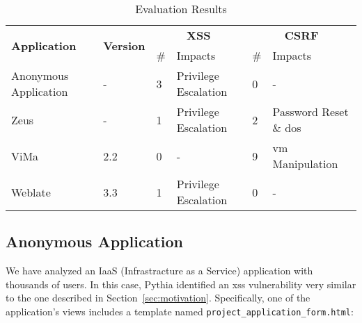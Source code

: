 \begin{center}
\begin{table}[b]
  \caption{Evaluation Results}
  \vspace{-1.9mm}
  \begin{tabular}{|p{1.8cm}| l | lp{1.6cm}|lp{1.6cm}|}
    \hline
     \multirow{2}{*}{\textbf{Application}} &
        \multirow{2}{*}{\textbf{Version}} &
        \multicolumn{2}{c|}{\textbf{XSS}} &
        \multicolumn{2}{c|}{\textbf{CSRF}} \\ 
        & & {\#} &  {Impacts} & {\#}  & {Impacts} \\ \hline
        Anonymous Application & - & 3 & Privilege Escalation & 0 & - \\
        \hline
        Zeus & - & 1 & Privilege Escalation & 2 & Password Reset \& {\sc d}o{\sc s}  \\ \hline
        ViMa & 2.2 & 0 & - & 9 & {\sc vm} Manipulation \\ \hline
        Weblate & 3.3 & 1 & Privilege Escalation & 0 & - \\
    \hline
  \end{tabular}
  \label{tabular:apps}
\end{table}

\end{center}


\subsection{Anonymous Application}
\label{sec:okeanos}

We have analyzed an IaaS
(Infrastracture as a Service)
application with thousands of users.
In this case,
Pythia identified an {\sc xss} vulnerability
very similar to the one described in
Section~\ref{sec:motivation}.
Specifically,
one of the application's views
includes a template named
{\tt project\_application\_form.html}:

